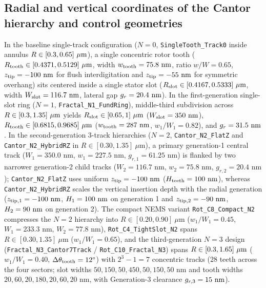 \documentclass[11pt,letterpaper]{article}
\begin{document}
\subsection*{Radial and vertical coordinates of the Cantor hierarchy and control geometries}
In the baseline single-track configuration ($N=0$, \texttt{SingleTooth\_Track0} inside annulus $R \in [0.3{}, 0.65{}]\ \mu\text{m}$), a single concentric rotor tooth ($R_{\rm tooth} \in [0.4371, 0.5129]\ \mu\text{m}$, width $w_{\rm tooth} = 75.8{}\text{ nm}$, ratio $w/W = 0.65$, $z_{\rm tip} = -100\text{ nm}$ for flush interdigitation and $z_{\rm tip} = -55\text{ nm}$ for symmetric overhang) sits centered inside a single stator slot ($R_{\rm slot} \in [\SingletoothTrackzeroSlotRInUm{}, \SingletoothTrackzeroSlotROutUm{}]\ \mu\text{m}$, width $W_{\rm slot} = 116.7{}\text{ nm}$, lateral gap $g_r = 20.4{}\text{ nm}$). In the first-generation single-slot ring ($N=1$, \texttt{Fractal\_N1\_FundRing}), middle-third subdivision across $R \in [0.3{}, 1.35{}]\ \mu\text{m}$ yields $R_{\rm slot} \in [0.65{}, 1{}]\ \mu\text{m}$ ($W_{\rm slot} = 350{}\text{ nm}$), $R_{\rm tooth} \in [0.6815, 0.9685]\ \mu\text{m}$ ($w_{\rm tooth} = 287{}\text{ nm}$, $w_1/W_1 = 0.82$), and $g_r = 31.5{}\text{ nm}$. In the second-generation 3-track hierarchies ($N=2$, \texttt{Cantor\_N2\_FlatZ} and \texttt{Cantor\_N2\_HybridRZ} in $R \in [0.30, 1.35]\ \mu\text{m}$), a primary generation-1 central track ($W_1 = 350.0\text{ nm}$, $w_1 = 227.5\text{ nm}$, $g_{r,1} = 61.25\text{ nm}$) is flanked by two narrower generation-2 child tracks ($W_2 = 116.7\text{ nm}$, $w_2 = 75.8\text{ nm}$, $g_{r,2} = 20.4\text{ nm}$); \texttt{Cantor\_N2\_FlatZ} uses uniform $z_{\rm tip} = -100\text{ nm}$ ($H_{\rm teeth} = 100\text{ nm}$), whereas \texttt{Cantor\_N2\_HybridRZ} scales the vertical insertion depth with the radial generation ($z_{\rm tip,1} = -100{}\text{ nm}$, $H_1 = 100{}\text{ nm}$ on generation 1 and $z_{\rm tip,2} = -90{}\text{ nm}$, $H_2 = 90{}\text{ nm}$ on generation 2). The compact NEMS variant \texttt{Rot\_C8\_Compact\_N2} compresses the $N=2$ hierarchy into $R \in [0.20, 0.90]\ \mu\text{m}$ ($w_1/W_1 = 0.45$, $W_1 = 233.3\text{ nm}$, $W_2 = 77.8\text{ nm}$), \texttt{Rot\_C4\_TightSlot\_N2} spans $R \in [0.30, 1.35]\ \mu\text{m}$ ($w_1/W_1 = 0.65$), and the third-generation $N=3$ design (\texttt{Fractal\_N3\_Cantor7Track} / \texttt{Rot\_C10\_Fractal\_N3}) spans $R \in [0.3{}, 1.65{}]\ \mu\text{m}$ ($w_1/W_1 = 0.40$, $\Delta\theta_{\rm tooth} = 12^\circ$) with $2^3 - 1 = 7$ concentric tracks ($28$ teeth across the four sectors; slot widths $50, 150, 50, 450, 50, 150, 50\text{ nm}$ and tooth widths $20, 60, 20, 180, 20, 60, 20\text{ nm}$, with Generation-3 clearance $g_{r,3} = 15{}\text{ nm}$).
\end{document}
